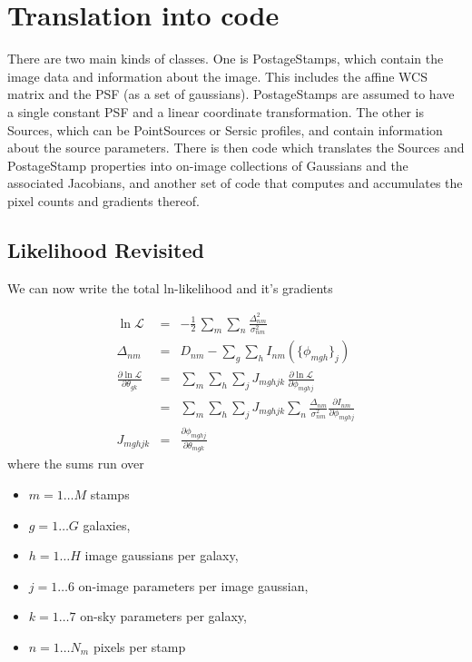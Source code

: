 \documentclass[modern]{aastex62}
\newcommand{\like}{\mathcal{L}}
\begin{document}
\section{Translation into code}
There are two main kinds of classes.
One is PostageStamps, which contain the image data and information about the image.
This includes the affine WCS matrix and the PSF (as a set of gaussians).
PostageStamps are assumed to have a single constant PSF and a linear coordinate transformation.
 The other is Sources, which can be PointSources or Sersic profiles, and contain information about the source parameters.
There is then code which translates the Sources and PostageStamp properties into on-image collections of Gaussians and the associated Jacobians, 
and another set of code that computes and accumulates the pixel counts and gradients thereof.

\subsection{Likelihood Revisited}
We can now write the total ln-likelihood and it's gradients

\begin{eqnarray}
  \ln \like & = & -\frac{1}{2} \, \sum_m \sum_n \frac{\Delta^2_{nm}}{\sigma^2_{nm}} \nonumber \\
  \Delta_{nm} & = & D_{nm} - \sum_g \sum_h I_{nm} (\{\phi_{mgh}\}_j) \nonumber \\
  \frac{\partial \ln \like}{\partial \theta_{gk}} & = & \sum_m \sum_h \sum_j J_{mghjk} \, \frac{\partial \ln \like}{\partial \phi_{mghj}} \nonumber \\
   & = & \sum_m \sum_h \sum_j J_{mghjk} \sum_n \frac{\Delta_{nm}}{\sigma^2_{nm}} \frac{\partial I_{nm}}{\partial \phi_{mghj}} \nonumber \\
   J_{mghjk} & = & \frac{\partial \phi_{mghj}}{\partial \theta_{mgk}}
\end{eqnarray}
where the sums run over
\begin{itemize}
  \item $m=1 \ldots M$ stamps
  \item $g=1 \ldots G$ galaxies,
  \item $h=1 \ldots H$ image gaussians per galaxy,
  \item $j=1 \ldots 6$ on-image parameters per image gaussian,
  \item $k=1 \ldots 7$ on-sky parameters per galaxy,
  \item $n=1 \ldots N_m$ pixels per stamp
\end{itemize}
\end{document}
